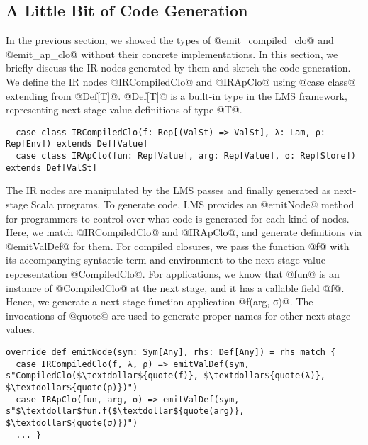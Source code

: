 \subsection{A Little Bit of Code Generation}

In the previous section, we showed the types of @emit_compiled_clo@ and
@emit_ap_clo@ without their concrete implementations. In this section, we briefly
discuss the IR nodes generated by them and sketch the code generation.
We define the IR nodes @IRCompiledClo@ and @IRApClo@ using @case class@
extending from @Def[T]@. @Def[T]@ is a built-in type in the LMS framework,
representing next-stage value definitions of type @T@.
\begin{lstlisting}
  case class IRCompiledClo(f: Rep[(ValSt) => ValSt], λ: Lam, ρ: Rep[Env]) extends Def[Value]
  case class IRApClo(fun: Rep[Value], arg: Rep[Value], σ: Rep[Store]) extends Def[ValSt]
\end{lstlisting}

The IR nodes are manipulated by the LMS passes and finally generated as
next-stage Scala programs. To generate code, LMS provides an @emitNode@ method for
programmers to control over what code is generated for each kind of nodes. Here,
we match @IRCompiledClo@ and @IRApClo@, and generate definitions via
@emitValDef@ for them.  For compiled closures, we pass the function @f@ with its
accompanying syntactic term and environment to the next-stage value
representation @CompiledClo@. For applications, we know that @fun@ is
an instance of @CompiledClo@ at the next stage, and it has a callable field
@f@. Hence, we generate a next-stage function application @f(arg, σ)@.  The
invocations of @quote@ are used to generate proper names for other
next-stage values.
\begin{lstlisting}
override def emitNode(sym: Sym[Any], rhs: Def[Any]) = rhs match {
  case IRCompiledClo(f, λ, ρ) => emitValDef(sym, s"CompiledClo($\textdollar${quote(f)}, $\textdollar${quote(λ)}, $\textdollar${quote(ρ)})")
  case IRApClo(fun, arg, σ) => emitValDef(sym, s"$\textdollar$fun.f($\textdollar${quote(arg)}, $\textdollar${quote(σ)})")
  ... }
\end{lstlisting}
